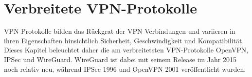 \chapter{Verbreitete \gls{VPN}-Protokolle} \label{intro-protokolle}

\gls{VPN}-Protokolle bilden das Rückgrat der \gls{VPN}-Verbindungen und variieren in ihren Eigenschaften hinsichtlich Sicherheit, Geschwindigkeit und Kompatibilität. Dieses Kapitel beleuchtet daher die am verbreitetsten \gls{VPN}-Protokolle OpenVPN, \gls{IPSec} und WireGuard. WireGuard ist dabei mit seinem Release im Jahr 2015 noch relativ neu, während \gls{IPSec} 1996 und OpenVPN 2001 veröffentlicht wurden.